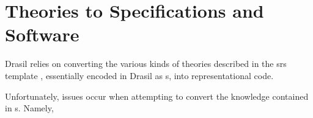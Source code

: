 \section{Theories to Specifications and Software}

Drasil relies on converting the various kinds of theories described in the
\acs{srs} template \cite{SmithAndLai2005}, essentially encoded in Drasil as
\RelationConcept{}s, into representational code.


Unfortunately, issues occur when attempting to convert the knowledge contained
in \RelationConcept{}s. Namely,


\originalRelToQDHaskell{}


